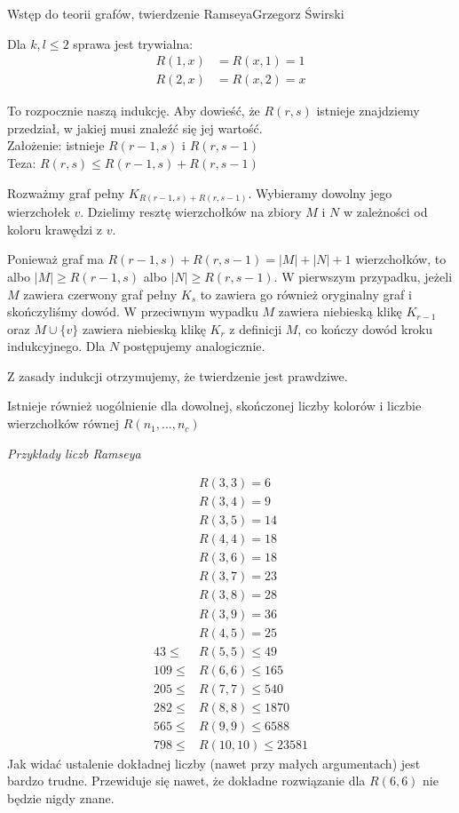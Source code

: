 \begin{referat}{Wstęp do teorii grafów, twierdzenie Ramseya}{Grzegorz Świrski}
\begin{teoria}
\begin{dowod}
Dla $k, l \leq 2$ sprawa jest trywialna:
\begin{align*}
R\left(1, x\right) &= R\left(x, 1\right) = 1\\
R\left(2, x\right) &= R\left(x, 2\right) = x
\end{align*}

To rozpocznie naszą indukcję. Aby dowieść, że $R(r,s)$ istnieje znajdziemy przedział, w jakiej musi znaleźć się jej wartość. \\
Założenie: istnieje $R(r-1, s)$ i $R(r, s-1)$ \\
Teza: $R(r, s) \leq R(r-1,s) + R(r,s-1)$

Rozważmy graf pełny $K_{R(r-1,s) + R(r, s-1)}$. Wybieramy dowolny jego wierzchołek $v$. Dzielimy resztę wierzchołków na zbiory $M$ i $N$ w zależności od koloru krawędzi z $v$.

Ponieważ graf ma $R(r-1,s) + R(r, s-1) = |M| + |N| + 1$ wierzchołków, to albo $|M| \geq R(r-1,s)$ albo $|N| \geq R(r, s-1)$. W pierwszym przypadku, jeżeli $M$ zawiera czerwony graf pełny $K_s$ to zawiera go również oryginalny graf i skończyliśmy dowód. W przeciwnym wypadku $M$ zawiera niebieską klikę $K_{r-1}$ oraz $M \cup{} \{v\}$ zawiera niebieską klikę $K_r$ z definicji $M$, co kończy dowód kroku indukcyjnego. Dla $N$ postępujemy analogicznie.

Z zasady indukcji otrzymujemy, że twierdzenie jest prawdziwe.
\end{dowod}

Istnieje również uogólnienie dla dowolnej, skończonej liczby kolorów i liczbie wierzchołków równej $R\left(n_{1},..., n_{c}\right)$

\textit{Przykłady liczb Ramseya}

\begin{align*}
&R(3,3) = 6\\
&R(3,4) = 9\\
&R(3,5) = 14\\
&R(4,4) = 18\\
&R(3,6) = 18\\
&R(3,7) = 23\\
&R(3,8) = 28\\
&R(3,9) = 36\\
&R(4,5) = 25\\
43 \leq &R(5,5)\leq 49\\
109 \leq &R(6,6)\leq 165\\
205 \leq &R(7,7)\leq 540\\
282 \leq &R(8,8)\leq 1870\\
565 \leq &R(9,9)\leq 6588\\
798 \leq &R(10,10)\leq 23581
\end{align*}
Jak widać ustalenie dokładnej liczby (nawet przy małych argumentach) jest bardzo trudne. Przewiduje się nawet, że dokładne rozwiązanie dla $R(6,6)$ nie będzie nigdy znane.


\end{teoria}
\end{referat}
